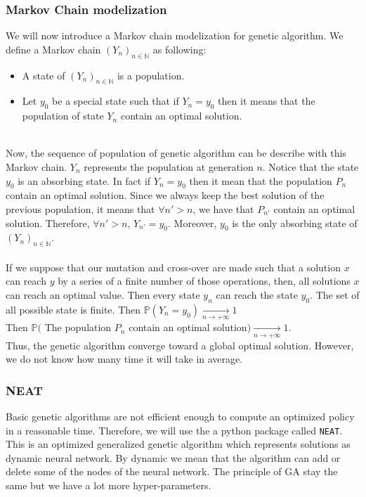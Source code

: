 \documentclass[11pt,a4paper]{article}
\newcommand{\tab}{\phantom{xxx}}
\newcommand{\mlist}[1]{\begin{itemize}[noitemsep,topsep=0pt]#1\end{itemize}}
\begin{document}
			\subsubsection*{Markov Chain modelization}
We will now introduce a Markov chain modelization for genetic algorithm. We define a Markov chain $(Y_n)_{n\in\mathbb{N}}$ as following:
\mlist{
\item A state of $(Y_n)_{n\in\mathbb{N}}$ is a population.
\item Let $y_0$ be a special state such that if $Y_n = y_0$ then it means that the population of state $Y_n$ contain an optimal solution.
}
\tab \\
Now, the sequence of population of genetic algorithm can be describe with this Markov chain. $Y_n$ represents the population at generation $n$. Notice that the state $y_0$ is an absorbing state. In fact if $Y_n = y_0$ then it mean that the population $P_n$ contain an optimal solution. Since we always keep the best solution of the previous population, it means that $\forall n'>n$, we have that $P_{n'}$ contain an optimal solution. Therefore, $\forall n'>n$, $Y_{n'} = y_0$. Moreover, $y_0$ is the only absorbing state of $(Y_n)_{n\in\mathbb{N}}$.\\
\\
If we suppose that our mutation and cross-over are made such that a solution $x$ can reach $y$ by a series of a finite number of those operations, then, all solutions $x$ can reach an optimal value. Then every state $y_n$ can reach the state $y_0$. The set of all possible state is finite. Then $\mathbb{P}(Y_n = y_0) \underset{n \rightarrow +\infty}{\rightarrow} 1$\\
Then $\mathbb{P}($ The population $P_n$ contain an optimal solution$) \underset{n \rightarrow +\infty}{\rightarrow} 1$.\\
Thus, the genetic algorithm converge toward a global optimal solution. However, we do not know how many time it will take in average.
		
			\subsubsection*{NEAT}
Basic genetic algorithms are not efficient enough to compute an optimized policy in a reasonable time. 
Therefore, we will use the a python package called \texttt{NEAT}. 
This is an optimized generalized genetic algorithm which represents solutions as dynamic neural network. 
By dynamic we mean that the algorithm can add or delete some of the nodes of the neural network. 
The principle of GA stay the same but we have a lot more hyper-parameters.
	
\end{document}
